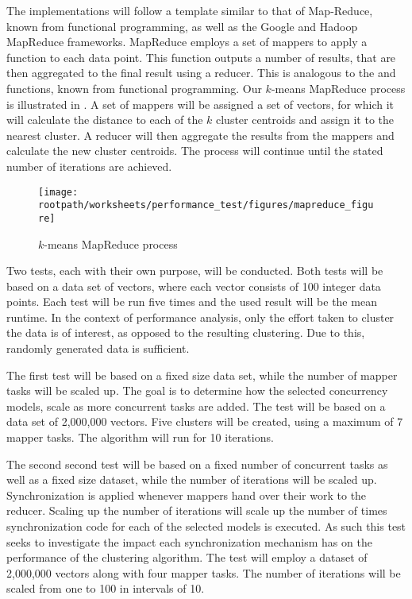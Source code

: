 The implementations will follow a template similar to that of Map-Reduce\cite{dean2008mapreduce}, known from functional programming, as well as the Google and Hadoop MapReduce frameworks. MapReduce employs a set of mappers to apply a function to each data point. This function outputs a number of results, that are then aggregated to the final result using a reducer. This is analogous to the  and  functions, known from functional programming. Our $k$-means MapReduce process is illustrated in . A set of mappers will be assigned a set of vectors, for which it will calculate the distance to each of the $k$ cluster centroids and assign it to the nearest cluster. A reducer will then aggregate the results from the mappers and calculate the new cluster centroids. The process will continue until the stated number of iterations are achieved.

\begin{figure}[ht!]
\centering
\texttt{[image: \\rootpath/worksheets/performance\_test/figures/mapreduce\_figure]}
\caption{$k$-means MapReduce process}\label{fig:kmeans_mapreduce}
\end{figure}

Two tests, each with their own purpose, will be conducted. Both tests will be based on a data set of vectors, where each vector consists of 100 integer data points. Each test will be run five times and the used result will be the mean runtime. In the context of performance analysis, only the effort taken to cluster the data is of interest, as opposed to the resulting clustering. Due to this, randomly generated data is sufficient.

The first test will be based on a fixed size data set, while the number of mapper tasks will be scaled up. The goal is to determine how the selected concurrency models, scale as more concurrent tasks are added. The test will be based on a data set of 2,000,000 vectors. Five clusters will be created, using a maximum of 7 mapper tasks. The algorithm will run for 10 iterations.

The second second test will be based on a fixed number of concurrent tasks as well as a fixed size dataset, while the number of iterations will be scaled up.  Synchronization is applied whenever mappers hand over their work to the reducer. Scaling up the number of iterations will scale up the number of times synchronization code for each of the selected models is executed. As such this test seeks to investigate the impact each synchronization mechanism has on the performance of the clustering algorithm. The test will employ a dataset of 2,000,000 vectors along with four mapper tasks. The number of iterations will be scaled from one to 100 in intervals of 10.

